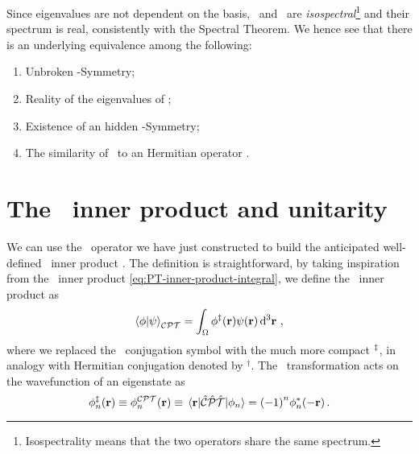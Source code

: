            Since eigenvalues are not dependent on the basis, \hH\ and \hF\ are \emph{isospectral}\footnote{Isospectrality means that the two operators share the same spectrum.} and their spectrum is real, consistently with the Spectral Theorem. We hence see that there is an underlying equivalence among the following:
            \begin{enumerate}[label = \mybullet]
                \item Unbroken \PT-Symmetry;
                \item Reality of the eigenvalues of \hH;
                \item Existence of an hidden \CPT-Symmetry;
                \item The similarity of \hH\ to an Hermitian operator \hF.
            \end{enumerate}

    \section{The \CPT\ inner product and unitarity}
        We can use the \hC\ operator we have just constructed to build the anticipated well-defined \CPT\ inner product \cite{bender2024}. The definition is straightforward, by taking inspiration from the \PT\ inner product \eqref{eq:PT-inner-product-integral}, we define the \CPT\ inner product as
        \begin{equation}
            \braket{\phi}{\psi}_{\CPT} = \int\nolimits_\Omega \phi^{\myconj}\pqty{\vb{r}} \psi\pqty{\vb{r}} \dd[3]{\vb{r}}
            \mycomma
        \end{equation}
        where we replaced the \CPT\ conjugation symbol with the much more compact $^\ddag$, in analogy with Hermitian conjugation denoted by $^\dag$. The \CPT\ transformation acts on the wavefunction of an eigenstate as
        \begin{equation}
            \label{eq:CPT-conjugation}
            \phi_n^\myconj\pqty{\vb{r}}
            \equiv \phi_n^{\CPT}\pqty{\vb{r}}
            \equiv \mel{\vb{r}}{\hCPT}{\phi_n}
            = \pqty{-1}^n \phi_n^*\pqty{-\vb{r}}
            \myperiod
        \end{equation}

